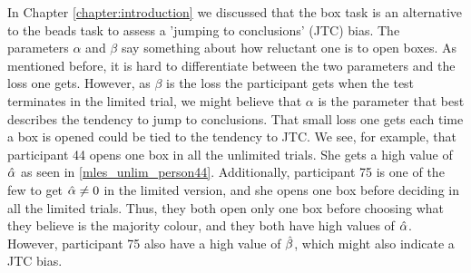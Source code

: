 In Chapter \ref{chapter:introduction} we discussed that the box task is an alternative to the beads task to assess a 'jumping to conclusions' (JTC) bias. The parameters $\alpha$ and $\beta$ say something about how reluctant one is to open boxes. As mentioned before, it is hard to differentiate between the two parameters and the loss one gets. 
However, as $\beta$ is the loss the participant gets when the test terminates in the limited trial, we might believe that $\alpha$ is the parameter that best describes the tendency to jump to conclusions. That small loss one gets each time a box is opened could be tied to the tendency to JTC. We see, for example, that participant 44 opens one box in all the unlimited trials. She gets a high value of $\hat{\alpha}$ as seen in \eqref{mles_unlim_person44}.  Additionally, participant 75 is one of the few to get $\hat{\alpha} \neq 0$ in the limited version, and she opens one box before deciding in all the limited trials. 
Thus, they both open only one box before choosing what they believe is the majority colour, and they both have high values of $\hat{\alpha}$. However, participant 75 also have a high value of $\hat{\beta}$, which might also indicate a JTC bias. 



